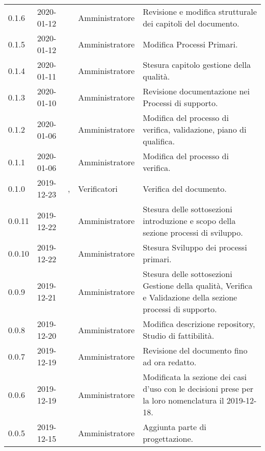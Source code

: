 {\begin{longtable}{C{2cm} C{2cm}  C{3cm}  C{3cm} C{4.5cm}}
0.1.6 & 2020-01-12 & \MC{} & Amministratore & Revisione e modifica strutturale dei capitoli del documento. \\

0.1.5 & 2020-01-12 & \AT{} & Amministratore & Modifica Processi Primari. \\

0.1.4 & 2020-01-11 & \MC{} & Amministratore & Stesura capitolo gestione della qualità. \\

0.1.3 & 2020-01-10 & \MC{} & Amministratore & Revisione documentazione nei Processi di supporto. \\

0.1.2 & 2020-01-06 & \AT{} & Amministratore & Modifica del processo di verifica, validazione, piano di qualifica. \\

0.1.1 & 2020-01-06 & \AT{} & Amministratore & Modifica del processo di verifica. \\

0.1.0 & 2019-12-23 & \PF{}, \CE{} & Verificatori & Verifica del documento. \\

0.0.11 & 2019-12-22 & \PF{} & Amministratore & Stesura delle sottosezioni introduzione e scopo della sezione processi di sviluppo. \\

0.0.10 & 2019-12-22 & \PF{}  & Amministratore & Stesura Sviluppo dei processi primari. \\

0.0.9 & 2019-12-21 & \PF{} & Amministratore & Stesura delle sottosezioni Gestione della qualità, Verifica e Validazione della sezione processi di supporto. \\

0.0.8 & 2019-12-20 & \MC{} & Amministratore & Modifica descrizione repository, Studio di fattibilità. \\

0.0.7 & 2019-12-19 & \SE{} & Amministratore & Revisione del documento fino ad ora redatto. \\

0.0.6 & 2019-12-19 & \CE{} & Amministratore & Modificata la sezione dei casi d’uso con le decisioni prese per la loro nomenclatura il 2019-12-18. \\

0.0.5 & 2019-12-15 & \SE{} & Amministratore & Aggiunta parte di progettazione. \\


\end{longtable}}
